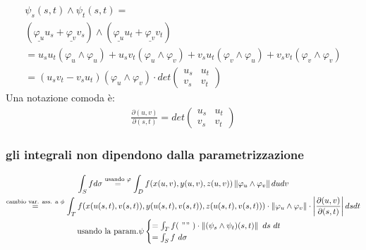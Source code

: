 \documentclass[a4paper, oneside]{article}
\begin{document}
\begin{gather*}
  \psi_s (s,t) \land \psi_t (s,t) = \\
  \left( \underline{\varphi_u} u_s + \underline{\varphi_v} v_s \right) \land \left( \underline{\varphi_u} u_t + \underline{\varphi_v} v_t \right)\\
  = u_s u_t ( \varphi_u \land \varphi_u ) + u_s v_t ( \varphi_u \land \varphi_v ) + v_s u_t ( \varphi_v \land \varphi_u ) + v_s v_t ( \varphi_v \land \varphi_v )\\
  = (u_s v_t - v_s u_t) ( \varphi_u \land \varphi_v )
   \cdot det \begin{pmatrix}
    u_s & u_t\\
    v_s & v_t
  \end{pmatrix}
\end{gather*}
Una notazione comoda è:
\begin{gather*}
  \frac{\partial (u,v)}{\partial (s,t)} = det \begin{pmatrix}
    u_s & u_t\\
    v_s & v_t
  \end{pmatrix}
\end{gather*}


\subsubsection{gli integrali non dipendono dalla parametrizzazione}
\begin{gather*}
  \int_S f d\sigma \overset{\text{usando } \varphi}{=} \int_D f(x(u,v), y(u,v), z(u,v)) \left\lVert \varphi_u \land \varphi_v \right\rVert dudv\\
  \overset{\text{cambio var. ass. a } \phi}{=} \int_T f(x(u(s,t), v(s,t)), y(u(s,t), v(s,t)), z(u(s,t), v(s,t))) \cdot \left\lVert \varphi_u \land \varphi_v \right\rVert \cdot \left| \frac{\partial (u,v)}{\partial (s,t)} \right| dsdt\\
  \text{usando la param.} \psi \begin{cases}
    = \int_T f( \ "" \ ) \cdot \left\lVert (\psi_s \land \psi_t) (s,t) \right\rVert \ ds \ dt\\
    = \int_S f \ d\sigma
  \end{cases}
\end{gather*}
\end{document}
